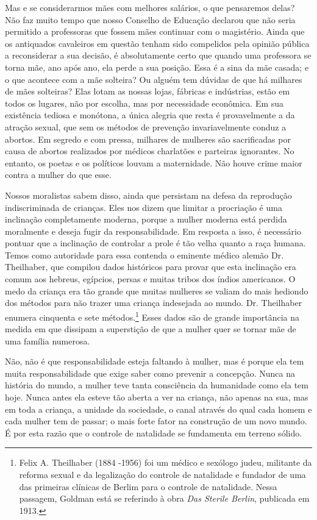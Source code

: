 Mas e se considerarmos mães com melhores salários, o que pensaremos
delas? Não faz muito tempo que nosso Conselho de Educação declarou que
não seria permitido a professoras que fossem mães continuar com o
magistério. Ainda que os antiquados cavaleiros em questão tenham sido
compelidos pela opinião pública a reconsiderar a sua decisão, é
absolutamente certo que quando uma professora se torna mãe, ano após
ano, ela perde a sua posição. Essa é a sina da mãe casada; e o que
acontece com a mãe solteira? Ou alguém tem dúvidas de que há milhares de
mães solteiras? Elas lotam as nossas lojas, fábricas e indústrias, estão
em todos os lugares, não por escolha, mas por necessidade econômica. Em
sua existência tediosa e monótona, a única alegria que resta é
provavelmente a da atração sexual, que sem os métodos de prevenção
invariavelmente conduz a abortos. Em segredo e com pressa, milhares de
mulheres são sacrificadas por causa de abortos realizados por médicos
charlatões e parteiras ignorantes. No entanto, os poetas e os políticos
louvam a maternidade. Não houve crime maior contra a mulher do que esse.

Nossos moralistas sabem disso, ainda que persistam na defesa da
reprodução indiscriminada de crianças. Eles nos dizem que limitar a
procriação é uma inclinação completamente moderna, porque a mulher
moderna está perdida moralmente e deseja fugir da responsabilidade. Em
resposta a isso, é necessário pontuar que a inclinação de controlar a
prole é tão velha quanto a raça humana. Temos como autoridade para essa
contenda o eminente médico alemão Dr. Theilhaber, que compilou dados
históricos para provar que esta inclinação era comum aos hebreus,
egípcios, persas e muitas tribos dos índios americanos. O medo da
criança era tão grande que muitas mulheres se valiam do mais hediondo
dos métodos para não trazer uma criança indesejada ao mundo. Dr.
Theilhaber enumera cinquenta e sete métodos.\footnote{Felix A.
  Theilhaber (1884 -1956) foi um médico e sexólogo judeu, militante da
  reforma sexual e da legalização do controle de natalidade e fundador
  de uma das primeiras clínicas de Berlim para o controle de natalidade.
  Nessa passagem, Goldman está se referindo à obra \emph{Das Sterile
  Berlin}, publicada em 1913.} Esses dados são de grande importância na
medida em que dissipam a superstição de que a mulher quer se tornar mãe
de uma família numerosa.

Não, não é que responsabilidade esteja faltando à mulher, mas é porque
ela tem muita responsabilidade que exige saber como prevenir a
concepção. Nunca na história do mundo, a mulher teve tanta consciência
da humanidade como ela tem hoje. Nunca antes ela esteve tão aberta a ver
na criança, não apenas na sua, mas em toda a criança, a unidade da
sociedade, o canal através do qual cada homem e cada mulher tem de
passar; o mais forte fator na construção de um novo mundo. É por esta
razão que o controle de natalidade se fundamenta em terreno sólido.

